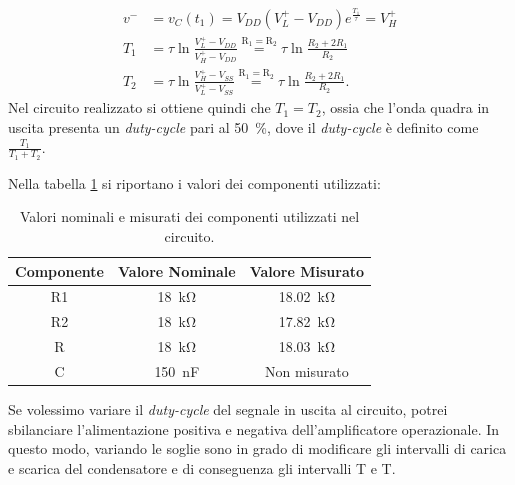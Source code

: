\begin{equation}
	\begin{split}
		v^-&=v_C(t_1)=V_{DD}(V_L^+-V_{DD})e^{\frac{T_1}{\tau}}=V_H^+ \\
		T_1&=\tau \ln{\frac{V_L^+-V_{DD}}{V_H^+-V_{DD}}}\overset{\mathrm{R_1=R_2}}{=}\tau \ln{\frac{R_2+2R_1}{R_2}} \\
		T_2&=\tau \ln{\frac{V_H^+-V_{SS}}{V_L^+-V_{SS}}}\overset{\mathrm{R_1=R_2}}{=}\tau \ln{\frac{R_2+2R_1}{R_2}}.
	\end{split}
\end{equation}
Nel circuito realizzato si ottiene quindi che $T_1=T_2$, ossia che l'onda quadra in uscita presenta un \textit{duty-cycle} pari al \SI{50}{\percent}, dove il \textit{duty-cycle} è definito come $\frac{T_1}{T_1+T_2}$.

\noindent
Nella tabella \ref{tab:valori_componenti_3} si riportano i valori dei componenti utilizzati:

\def\arraystretch{1.3}
\begin{table}[h]
	\centering
	\begin{tabular}{|c|c|c|}
		\hline
		Componente	& Valore Nominale & Valore Misurato \\ \hline
		R1 &\SI{18}{\kilo\ohm} & \SI{18,02}{\kilo\ohm} \\ \hline
		R2 &\SI{18}{\kilo\ohm} & \SI{17,82}{\kilo\ohm} \\ \hline
		R & \SI{18}{\kilo\ohm} & \SI{18,03}{\kilo\ohm} \\ \hline
		C & \SI{150}{\nano\farad} & Non misurato \\ \hline
	\end{tabular}
	\caption{Valori nominali e misurati dei componenti utilizzati nel circuito.}
	\label{tab:valori_componenti_3}
\end{table}

\noindent
Se volessimo variare il \textit{duty-cycle} del segnale in uscita al circuito, potrei sbilanciare l'alimentazione positiva e negativa dell'amplificatore operazionale. In questo modo, variando le soglie sono in grado di modificare gli intervalli di carica e scarica del condensatore e di conseguenza gli intervalli T e T.


